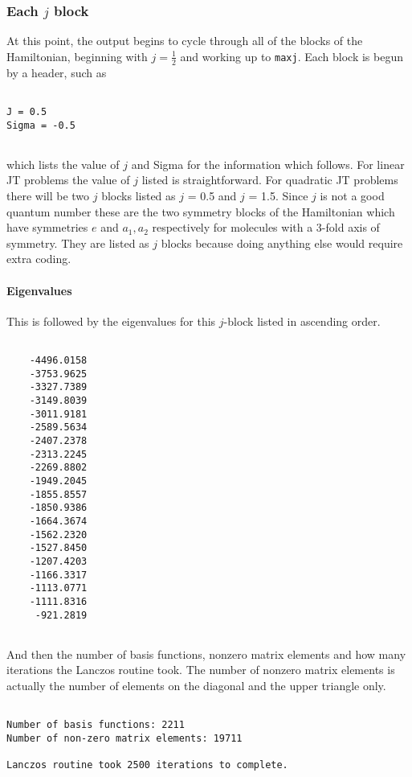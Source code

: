 \documentclass{article}
\begin{document}
\subsubsection{Each $j$ block}

At this point, the output begins to cycle through all of the blocks of
the Hamiltonian, beginning with $j=\frac{1}{2} $ and working up to
{\tt maxj}. Each block is begun by a header, such as
\begin{verbatim}
 
J = 0.5
Sigma = -0.5
 
\end{verbatim}

which lists the value of $j$ and Sigma for the information which follows. For linear JT problems the value of $j$ listed is straightforward. For quadratic JT problems there will be two $j$ blocks listed as $j$ = 0.5 and $j$ = 1.5. Since $j$ is not a good quantum number these are the two symmetry blocks of the Hamiltonian which have symmetries $e$ and $a_1, a_2$ respectively for molecules with a 3-fold axis of symmetry. They are listed as $j$ blocks because doing anything else would require extra coding.

\paragraph{Eigenvalues}
This is followed by the eigenvalues for this $j$-block listed in ascending order.

\begin{verbatim}

	-4496.0158
	-3753.9625
	-3327.7389
	-3149.8039
	-3011.9181
	-2589.5634
	-2407.2378
	-2313.2245
	-2269.8802
	-1949.2045
	-1855.8557
	-1850.9386
	-1664.3674
	-1562.2320
	-1527.8450
	-1207.4203
	-1166.3317
	-1113.0771
	-1111.8316
	 -921.2819
	 
\end{verbatim}

And then the number of basis functions, nonzero matrix elements and how many iterations the Lanczos routine took. The number of nonzero matrix elements is actually the number of elements on the diagonal and the upper triangle only. 

\begin{verbatim}
 
Number of basis functions: 2211
Number of non-zero matrix elements: 19711
 
Lanczos routine took 2500 iterations to complete.

\end{verbatim}
\end{document}
